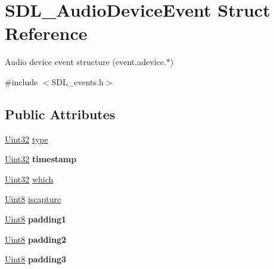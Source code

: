 \hypertarget{struct_s_d_l___audio_device_event}{}\section{S\+D\+L\+\_\+\+Audio\+Device\+Event Struct Reference}
\label{struct_s_d_l___audio_device_event}


Audio device event structure (event.\+adevice.$\ast$)  




{\ttfamily \#include $<$S\+D\+L\+\_\+events.\+h$>$}

\subsection*{Public Attributes}
\begin{DoxyCompactItemize}
\item 
\hyperlink{_s_d_l__stdinc_8h_add440eff171ea5f55cb00c4a9ab8672d}{Uint32} \hyperlink{struct_s_d_l___audio_device_event_ae68c3bd49b49608711a17395c7cbfe58}{type}
\item 
\mbox{\label{struct_s_d_l___audio_device_event_aa471680486a6103eafc9af569016df57}} 
\hyperlink{_s_d_l__stdinc_8h_add440eff171ea5f55cb00c4a9ab8672d}{Uint32} {\bfseries timestamp}
\item 
\hyperlink{_s_d_l__stdinc_8h_add440eff171ea5f55cb00c4a9ab8672d}{Uint32} \hyperlink{struct_s_d_l___audio_device_event_ac91d70fd4e1dd596185fed061388896c}{which}
\item 
\hyperlink{_s_d_l__stdinc_8h_a2944638813a090aa23e62f4da842c3e2}{Uint8} \hyperlink{struct_s_d_l___audio_device_event_a1482dcd50b47046ef8e9bfa7cc7457d9}{iscapture}
\item 
\mbox{\label{struct_s_d_l___audio_device_event_ad6efdec7189e735f4a05fc123c0cb723}} 
\hyperlink{_s_d_l__stdinc_8h_a2944638813a090aa23e62f4da842c3e2}{Uint8} {\bfseries padding1}
\item 
\mbox{\label{struct_s_d_l___audio_device_event_adf9bebd56d707860045d31359535a2a4}} 
\hyperlink{_s_d_l__stdinc_8h_a2944638813a090aa23e62f4da842c3e2}{Uint8} {\bfseries padding2}
\item 
\mbox{\label{struct_s_d_l___audio_device_event_af3163ba92c77f08a4f0d8f043f24c96c}} 
\hyperlink{_s_d_l__stdinc_8h_a2944638813a090aa23e62f4da842c3e2}{Uint8} {\bfseries padding3}
\end{DoxyCompactItemize}


